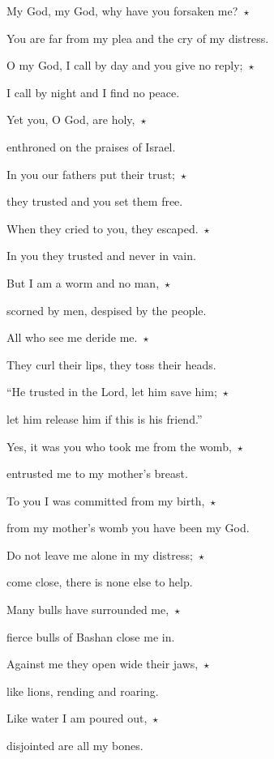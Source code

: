 \noindent My God, my God, why have you forsaken me?~$\star$~\nopagebreak

You are far from my plea and the cry of my distress.

\noindent O my God, I call by day and you give no reply;~$\star$~\nopagebreak

I call by night and I find no peace.

\noindent Yet you, O God, are holy,~$\star$~\nopagebreak

enthroned on the praises of Israel.

\noindent In you our fathers put their trust;~$\star$~\nopagebreak

they trusted and you set them free.

\noindent When they cried to you, they escaped.~$\star$~\nopagebreak

In you they trusted and never in vain.

\noindent But I am a worm and no man,~$\star$~\nopagebreak

scorned by men, despised by the people.

\noindent All who see me deride me.~$\star$~\nopagebreak

They curl their lips, they toss their heads.

\noindent “He trusted in the Lord, let him save him;~$\star$~\nopagebreak

let him release him if this is his friend.”

\noindent Yes, it was you who took me from the womb,~$\star$~\nopagebreak

entrusted me to my mother’s breast.

\noindent To you I was committed from my birth,~$\star$~\nopagebreak

from my mother’s womb you have been my God.

\noindent Do not leave me alone in my distress;~$\star$~\nopagebreak

come close, there is none else to help.

\noindent Many bulls have surrounded me,~$\star$~\nopagebreak

fierce bulls of Bashan close me in.

\noindent Against me they open wide their jaws,~$\star$~\nopagebreak

like lions, rending and roaring.

\noindent Like water I am poured out,~$\star$~\nopagebreak

disjointed are all my bones.

